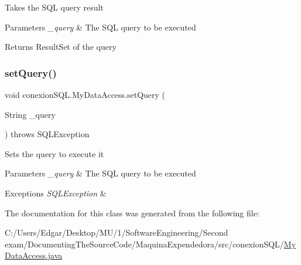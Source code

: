 Takes the S\+QL query result 
\begin{DoxyParams}{Parameters}
{\em \+\_\+query} & The S\+QL query to be executed \\
\hline
\end{DoxyParams}
\begin{DoxyReturn}{Returns}
Result\+Set of the query 
\end{DoxyReturn}
\mbox{\label{classconexion_s_q_l_1_1_my_data_access_a9c57d53829ea15bb0bc59d7647cc6249}} 
\subsubsection{\texorpdfstring{set\+Query()}{setQuery()}}
{\footnotesize\ttfamily void conexion\+S\+Q\+L.\+My\+Data\+Access.\+set\+Query (\begin{DoxyParamCaption}\item[{String}]{\+\_\+query }\end{DoxyParamCaption}) throws S\+Q\+L\+Exception\hspace{0.3cm}{\ttfamily [inline]}}

Sets the query to execute it 
\begin{DoxyParams}{Parameters}
{\em \+\_\+query} & The S\+QL query to be executed \\
\hline
\end{DoxyParams}

\begin{DoxyExceptions}{Exceptions}
{\em S\+Q\+L\+Exception} & \\
\hline
\end{DoxyExceptions}


The documentation for this class was generated from the following file\+:\begin{DoxyCompactItemize}
\item 
C\+:/\+Users/\+Edgar/\+Desktop/\+M\+U/1/\+Software\+Engineering/\+Second exam/\+Documenting\+The\+Source\+Code/\+Maquina\+Expendedora/src/conexion\+S\+Q\+L/\mbox{\hyperlink{_my_data_access_8java}{My\+Data\+Access.\+java}}\end{DoxyCompactItemize}
